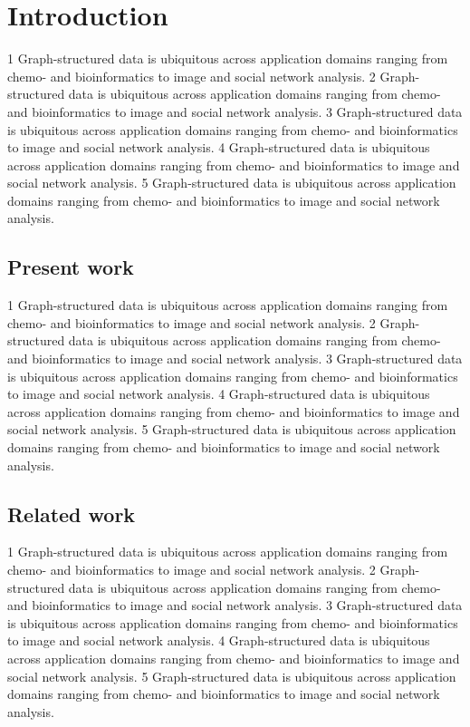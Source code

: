 \section{Introduction}
1 Graph-structured data is ubiquitous across application domains ranging from chemo- and bioinformatics to image and social network analysis.
2 Graph-structured data is ubiquitous across application domains ranging from chemo- and bioinformatics to image and social network analysis.
3 Graph-structured data is ubiquitous across application domains ranging from chemo- and bioinformatics to image and social network analysis.
4 Graph-structured data is ubiquitous across application domains ranging from chemo- and bioinformatics to image and social network analysis.
5 Graph-structured data is ubiquitous across application domains ranging from chemo- and bioinformatics to image and social network analysis.

\subsection{Present work}
1 Graph-structured data is ubiquitous across application domains ranging from chemo- and bioinformatics to image and social network analysis.
2 Graph-structured data is ubiquitous across application domains ranging from chemo- and bioinformatics to image and social network analysis.
3 Graph-structured data is ubiquitous across application domains ranging from chemo- and bioinformatics to image and social network analysis.
4 Graph-structured data is ubiquitous across application domains ranging from chemo- and bioinformatics to image and social network analysis.
5 Graph-structured data is ubiquitous across application domains ranging from chemo- and bioinformatics to image and social network analysis.

\subsection{Related work}
1 Graph-structured data is ubiquitous across application domains ranging from chemo- and bioinformatics to image and social network analysis.
2 Graph-structured data is ubiquitous across application domains ranging from chemo- and bioinformatics to image and social network analysis.
3 Graph-structured data is ubiquitous across application domains ranging from chemo- and bioinformatics to image and social network analysis.
4 Graph-structured data is ubiquitous across application domains ranging from chemo- and bioinformatics to image and social network analysis.
5 Graph-structured data is ubiquitous across application domains ranging from chemo- and bioinformatics to image and social network analysis.